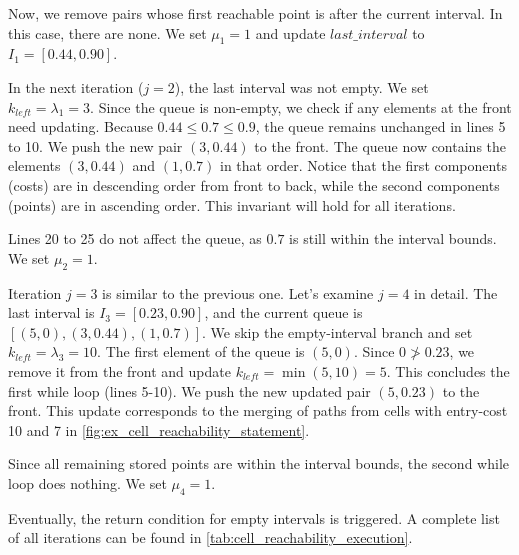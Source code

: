Now, we remove pairs whose first reachable point is after the current interval. In this case, there are none. We set \(\mu_1 = 1\) and update \(last\_interval\) to \(I_1 = [0.44, 0.90]\).

In the next iteration (\(j=2\)), the last interval was not empty. We set \(k_{left} = \lambda_1 = 3\). Since the queue is non-empty, we check if any elements at the front need updating. Because \(0.44 \leq 0.7 \leq 0.9\), the queue remains unchanged in lines 5 to 10. We push the new pair \((3, 0.44)\) to the front. The queue now contains the elements \((3, 0.44)\) and \((1, 0.7)\) in that order. Notice that the first components (costs) are in descending order from front to back, while the second components (points) are in ascending order. This invariant will hold for all iterations.

Lines 20 to 25 do not affect the queue, as \(0.7\) is still within the interval bounds. We set \(\mu_2 = 1\).

Iteration \(j = 3\) is similar to the previous one. Let's examine \(j = 4\) in detail. The last interval is \(I_3 = [0.23, 0.90]\), and the current queue is \([(5, 0), (3, 0.44), (1, 0.7)]\). We skip the empty-interval branch and set \(k_{left} = \lambda_3 = 10\). The first element of the queue is \((5, 0)\). Since \(0 \not> 0.23\), we remove it from the front and update \(k_{left} = \min(5, 10) = 5\). This concludes the first while loop (lines 5-10). We push the new updated pair \((5, 0.23)\) to the front. This update corresponds to the merging of paths from cells with entry-cost 10 and 7 in \cref{fig:ex_cell_reachability_statement}.

Since all remaining stored points are within the interval bounds, the second while loop does nothing. We set \(\mu_4 = 1\).

Eventually, the return condition for empty intervals is triggered. A complete list of all iterations can be found in \cref{tab:cell_reachability_execution}.

